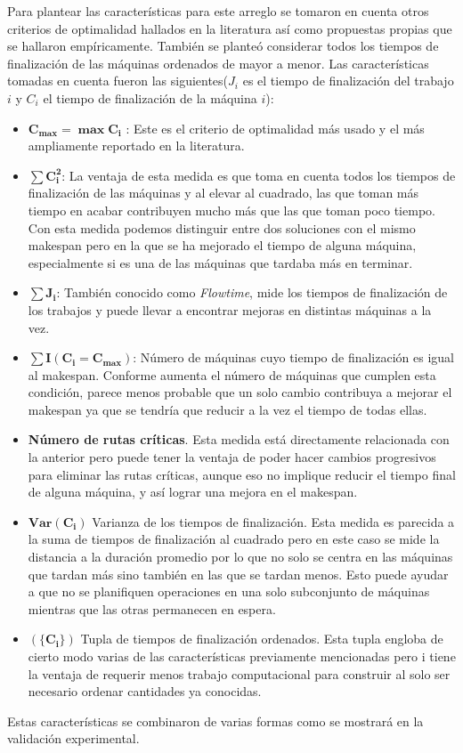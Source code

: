 Para plantear las características para este arreglo se tomaron en cuenta otros criterios de optimalidad hallados en la literatura así como propuestas 
propias que se hallaron empíricamente. 
%
También se planteó considerar todos los tiempos de finalización de las máquinas ordenados de mayor a menor.
%
Las características tomadas en cuenta fueron las siguientes($J_i$ es el tiempo de finalización del trabajo $i$ y $C_i$ el tiempo de finalización de la máquina $i$):
\begin{itemize}
    \item $\mathbf{C_{max} = \max{C_i}}$ : Este es el criterio de optimalidad más usado y el más ampliamente reportado en la literatura. 
    \item $\mathbf{\sum C_i^2}$: La ventaja de esta medida es que toma en cuenta todos los tiempos de finalización de las máquinas y al elevar al cuadrado, 
		las que toman más tiempo en acabar contribuyen mucho más que las que toman poco tiempo. Con esta medida podemos distinguir entre dos soluciones con el mismo makespan 
		pero en la que se ha mejorado el tiempo de alguna máquina, especialmente si es una de las máquinas que tardaba más en terminar.
    \item $\mathbf{\sum J_i}$: También conocido como \textit{Flowtime}, mide los tiempos de finalización de los trabajos y puede llevar a encontrar mejoras en distintas 
		máquinas a la vez.
    \item $\mathbf{\sum I(C_i=C_{max})}$: Número de máquinas cuyo tiempo de finalización es igual al makespan. Conforme aumenta el número de máquinas que cumplen esta 
		condición, parece menos probable que un solo cambio contribuya a mejorar el makespan ya que se tendría que reducir a la vez el tiempo de todas ellas. 
    \item \textbf{Número de rutas críticas}. Esta medida está directamente relacionada con la anterior pero puede tener la ventaja de poder hacer cambios progresivos 
		para eliminar las rutas críticas, aunque eso no implique reducir el tiempo final de alguna máquina, y así lograr una mejora en el makespan. 
    \item $\mathbf{Var(C_i)}$ Varianza de los tiempos de finalización. Esta medida es parecida a la suma de tiempos de finalización al cuadrado pero en este caso se 
		mide la distancia a la duración promedio por lo que no solo se centra en las máquinas que tardan más sino también en las que se tardan menos. Esto puede ayudar a 
		que no se planifiquen operaciones en una solo subconjunto de máquinas mientras que las otras permanecen en espera.
    \item $\mathbf{(\{C_i\})}$ Tupla de tiempos de finalización ordenados. Esta tupla engloba de cierto modo varias de las características previamente mencionadas pero i
		tiene la ventaja de requerir menos trabajo computacional para construir al solo ser necesario ordenar cantidades ya conocidas.
\end{itemize}

Estas características se combinaron de varias formas como se mostrará en la validación experimental. 
